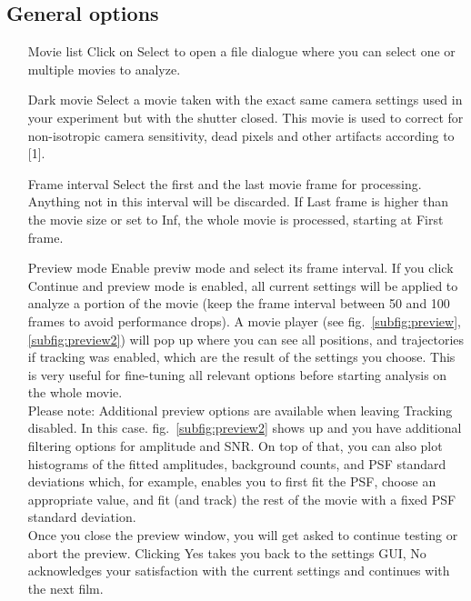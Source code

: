 \documentclass[11pt,onside]{report}
\numberwithin{equation}{chapter}
\begin{document}
\subsection*{General options}
\begin{itemize}[leftmargin=2cm]
\item[Movie list] Click on \textsf{Select} to open a file dialogue where you can select one or multiple movies to analyze.
\item[Dark movie] Select a movie taken with the exact same camera settings used in your experiment but with the shutter closed. This movie is used to correct for non-isotropic camera sensitivity, dead pixels and other artifacts according to [1].
\item[Frame interval] Select the first and the last movie frame for processing. Anything not in this interval will be discarded. If \textsf{Last frame} is higher than the movie size or set to \textsf{Inf}, the whole movie is processed, starting at \textsf{First frame}.
\item[Preview mode] Enable previw mode and select its frame interval. If you click \textsf{Continue} and preview mode is enabled, all current settings will be applied to analyze a portion of the movie (keep the frame interval between 50 and 100 frames to avoid performance drops). A movie player (see fig.~\ref{subfig:preview},\ref{subfig:preview2}) will pop up where you can see all positions, and trajectories if tracking was enabled, which are the result of the settings you choose. This is very useful for fine-tuning all relevant options before starting analysis on the whole movie.\\
Please note: Additional preview options are available when leaving \textsf{Tracking} disabled. In this case. fig.~\ref{subfig:preview2} shows up and you have additional filtering options for amplitude and SNR. On top of that, you can also plot histograms of the fitted amplitudes, background counts, and PSF standard deviations which, for example, enables you to first fit the PSF, choose an appropriate value, and fit (and track) the rest of the movie with a fixed PSF standard deviation.\\
Once you close the preview window, you will get asked to continue testing or abort the preview. Clicking \textsf{Yes} takes you back to the settings GUI, \textsf{No} acknowledges your satisfaction with the current settings and continues with the next film.
\end{itemize}
\end{document}
